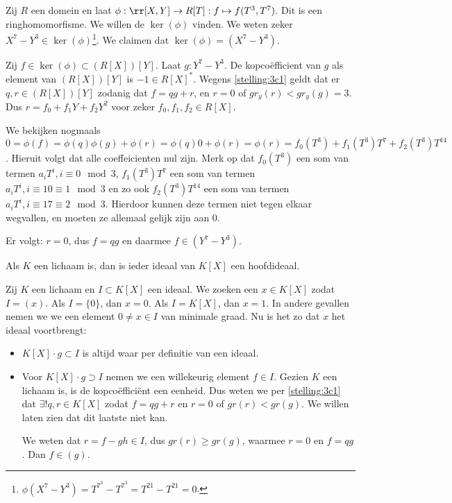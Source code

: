 \documentclass[a4paper,12pt,oneside]{book}
\begin{document}
\begin{voorbeeld}
Zij $R$ een domein en laat $\phi : \rr[X,Y] \to R[T] : f \mapsto f(T^3,T^7)$.
Dit is een ringhomomorfisme. We willen de $\ker(\phi)$ vinden. We weten zeker
$X^7 - Y^3 \in \ker(\phi)$\footnote{$\phi(X^7 - Y^3) = T^{7^3} - T^{7^3} = T^{21} -T^{21} = 0$.}. We claimen dat $\ker(\phi) = (X^7 - Y^3)$.
\begin{bewijs}
Zij $f \in \ker(\phi) \subset (R[X])[Y]$. Laat $g: Y^7 - Y^3$. De kopcoëfficient van $g$ als element van $(R[X])[Y]$ is $-1 \in R[X]^*$. Wegens \autoref{stelling:3c1} geldt dat er $q, r \in (R[X])[Y]$ zodanig dat $f = qg + r$, en $r=0$ of $gr_y(r) < gr_y(g) = 3$. Dus  $r = f_0 + f_1Y + f_2Y^2$ voor zeker $f_0,f_1,f_2 \in R[X]$.

We bekijken nogmaals $0 = \phi(f) = \phi(q)\phi(g) + \phi(r)=\phi(q)0 + \phi(r) = \phi(r) = f_0(T^3) + f_1(T^3)T^7 +f_2(T^3)T^14$. Hieruit volgt dat alle coeffeicienten nul zijn. Merk op dat $f_0(T^3)$ een som van termen $a_iT^i, i \equiv 0 \mod 3$, $f_1(T^3)T^7$ een som van termen $a_iT^i,i \equiv 10\equiv1 \mod 3$ en zo ook  $f_2(T^3)T^14$ een som van termen $a_iT^i,i \equiv 17\equiv 2 \mod 3$. Hierdoor kunnen deze termen niet tegen elkaar wegvallen, en moeten ze allemaal gelijk zijn aan 0. 

Er volgt: $r = 0$, dus $f = qg$ en daarmee $f \in ( Y^7 - Y^3)$.
\end{bewijs}
\end{voorbeeld}

\begin{gevolg}
Als $K$ een lichaam is, dan is ieder ideaal van $K[X]$ een hoofdideaal.
\end{gevolg}
\begin{bewijs}
Zij $K$ een lichaam en $I \subset K[X]$ een ideaal. We zoeken een $x \in K[X]$ zodat $I = (x)$. Als
$I = \{0\}$, dan $x=0$. Als $I= K[X]$, dan $x=1$. In andere gevallen nemen we we een element $0 \ne x \in I$ van minimale graad. Nu is het zo dat $x$ het ideaal voortbrengt:
\begin{itemize}
\item $K[X]\cdot g \subset I$ is altijd waar per definitie van een ideaal.
\item Voor $K[X]\cdot g \supset I$ nemen we een willekeurig element $f \in I$. Gezien $K$ een lichaam is, is de kopcoëfficiënt een eenheid. Dus weten we per \autoref{stelling:3c1} dat $\exists! q,r \in K[X]$ zodat $f=qg+r$ en $r=0$ of $gr(r) < gr(g)$. We willen laten zien dat dit laatste niet kan.

We weten dat $r= f-gh \in I$, dus $gr(r) \ge gr(g)$, waarmee $r= 0$ en $f=qg$. Dan $f\in (g)$.
\end{itemize}
\end{bewijs}
\end{document}
